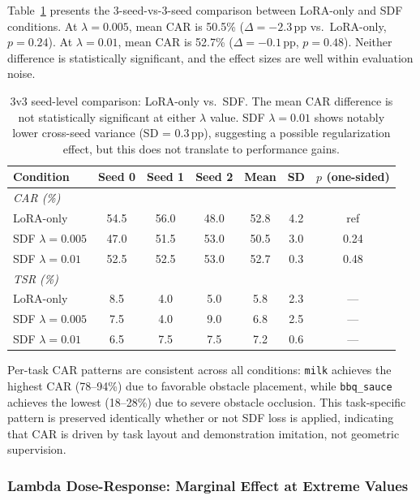 \documentclass[letterpaper]{article}
\begin{document}
Table~\ref{tab:3v3} presents the 3-seed-vs-3-seed comparison between LoRA-only and SDF conditions. At $\lambda = 0.005$, mean CAR is 50.5\% ($\Delta = -2.3$\,pp vs.\ LoRA-only, $p = 0.24$). At $\lambda = 0.01$, mean CAR is 52.7\% ($\Delta = -0.1$\,pp, $p = 0.48$). Neither difference is statistically significant, and the effect sizes are well within evaluation noise.

\begin{table}[t]
\centering
\caption{3v3 seed-level comparison: LoRA-only vs.\ SDF. The mean CAR difference is not statistically significant at either $\lambda$ value. SDF $\lambda{=}0.01$ shows notably lower cross-seed variance (SD = 0.3\,pp), suggesting a possible regularization effect, but this does not translate to performance gains.}
\label{tab:3v3}
\begin{tabular}{lcccccc}
\toprule
Condition & Seed 0 & Seed 1 & Seed 2 & Mean & SD & $p$ (one-sided) \\
\midrule
\multicolumn{7}{l}{\textit{CAR (\%)}} \\
LoRA-only & 54.5 & 56.0 & 48.0 & 52.8 & 4.2 & ref \\
SDF $\lambda{=}0.005$ & 47.0 & 51.5 & 53.0 & 50.5 & 3.0 & 0.24 \\
SDF $\lambda{=}0.01$ & 52.5 & 52.5 & 53.0 & 52.7 & 0.3 & 0.48 \\
\midrule
\multicolumn{7}{l}{\textit{TSR (\%)}} \\
LoRA-only & 8.5 & 4.0 & 5.0 & 5.8 & 2.3 & --- \\
SDF $\lambda{=}0.005$ & 7.5 & 4.0 & 9.0 & 6.8 & 2.5 & --- \\
SDF $\lambda{=}0.01$ & 6.5 & 7.5 & 7.5 & 7.2 & 0.6 & --- \\
\bottomrule
\end{tabular}
\end{table}

Per-task CAR patterns are consistent across all conditions: \texttt{milk} achieves the highest CAR (78--94\%) due to favorable obstacle placement, while \texttt{bbq\_sauce} achieves the lowest (18--28\%) due to severe obstacle occlusion. This task-specific pattern is preserved identically whether or not SDF loss is applied, indicating that CAR is driven by task layout and demonstration imitation, not geometric supervision.

\subsubsection{Lambda Dose-Response: Marginal Effect at Extreme Values}
\end{document}
